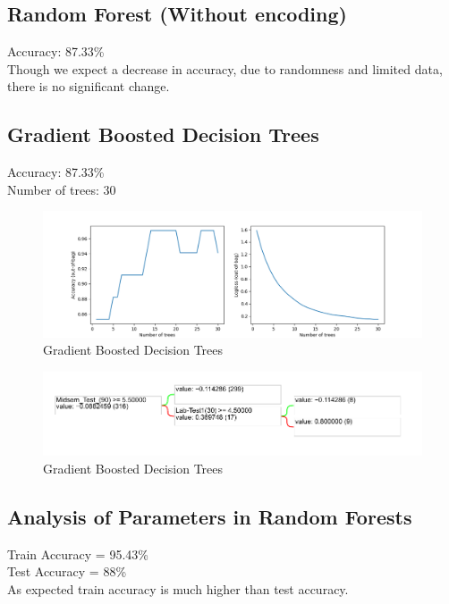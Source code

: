 \documentclass{assignmeownt}
\begin{document}
\subsection{Random Forest (Without encoding)}
Accuracy: 87.33\% \\
Though we expect a decrease in accuracy, due to randomness and limited data, there is no significant change. \\
\subsection{Gradient Boosted Decision Trees}
Accuracy: 87.33\% \\
Number of trees: 30 \\
\begin{figure}[H]
    \centering
    \includegraphics[width=\textwidth]{images/gbdtAcc.png}
    \caption{Gradient Boosted Decision Trees}
    \label{fig:4}
\end{figure}
\begin{figure}[H]
    \centering
    \includegraphics[width=\textwidth]{images/gbdt.pdf}
    \caption{Gradient Boosted Decision Trees}
    \label{fig:8}
\end{figure}

\subsection{Analysis of Parameters in Random Forests}
Train Accuracy = 95.43\% \\
Test Accuracy = 88\% \\
As expected train accuracy is much higher than test accuracy.
\end{document}
